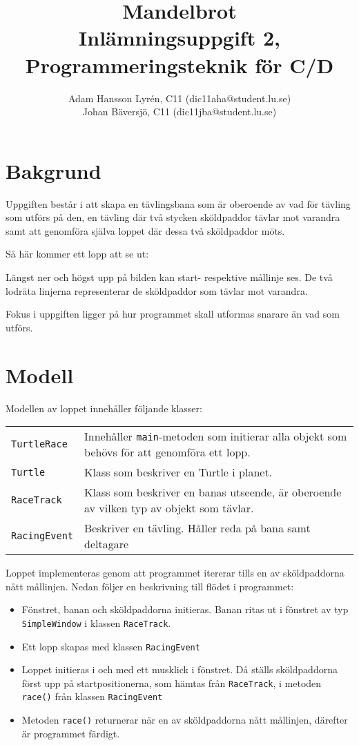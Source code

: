 \documentclass[a4paper]{article}
\title{Mandelbrot \\
	Inlämningsuppgift 2, Programmeringsteknik för C/D}
\author{Adam Hansson Lyrén, C11 (dic11aha@student.lu.se)\\
Johan Bäversjö, C11 (dic11jba@student.lu.se)}
\newcommand{\code}[1]{\texttt{#1}} %
\begin{document}

\maketitle
\thispagestyle{empty}
\newpage
\setcounter{page}{1}
\section{Bakgrund}
Uppgiften består i att skapa en tävlingsbana som är oberoende av vad för tävling som utförs på den, en tävling där två stycken sköldpaddor tävlar mot varandra samt att genomföra själva loppet där dessa två sköldpaddor möts.

Så här kommer ett lopp att se ut:
\begin{center}
\end{center}
Längst ner och högst upp på bilden kan start- respektive mållinje ses. De två lodräta linjerna representerar de sköldpaddor som tävlar mot varandra.

Fokus i uppgiften ligger på hur programmet skall utformas snarare än vad som utförs. 

\section{Modell}
Modellen av loppet innehåller följande klasser:


\begin{tabular}{lp{8cm}}
\code{TurtleRace} & Innehåller \code{main}-metoden som initierar alla objekt som behövs för att genomföra ett lopp. \\
\code{Turtle} & Klass som beskriver en Turtle i planet. \\
\code{RaceTrack} & Klass som beskriver en banas utseende, är oberoende av vilken typ av objekt som tävlar. \\
\code{RacingEvent} & Beskriver en tävling. Håller reda på bana samt deltagare \\

\end{tabular}

\vspace{\baselineskip}
Loppet implementeras genom att programmet itererar tills en av sköldpaddorna nått mållinjen.
Nedan följer en beskrivning till flödet i programmet:

\begin{itemize}
\item Fönstret, banan och sköldpaddorna initieras. Banan ritas ut i fönstret av typ \code{SimpleWindow} i klassen \code{RaceTrack}.
\item Ett lopp skapas med klassen \code{RacingEvent}
\item Loppet initieras i och med ett musklick i fönstret. Då ställs sköldpaddorna först upp på startpositionerna, som hämtas från \code{RaceTrack},  i metoden \code{race()} från klassen \code{RacingEvent}
\item Metoden \code{race()} returnerar när en av sköldpaddorna nått mållinjen, därefter är programmet färdigt. 
\end{itemize}
\end{document}
